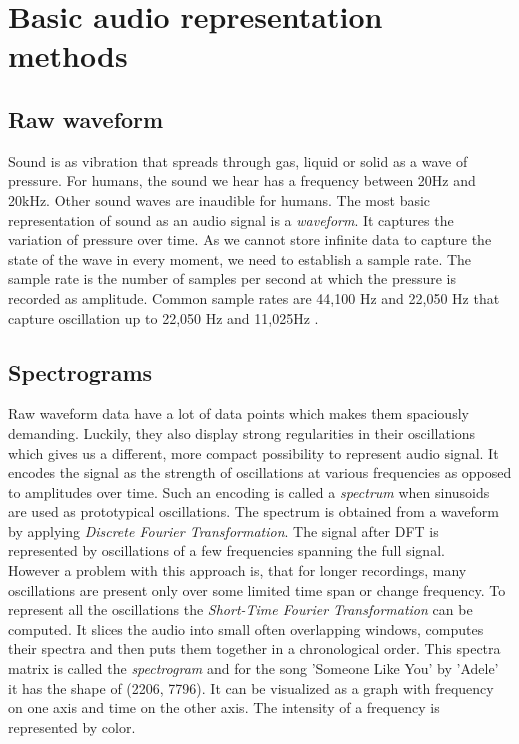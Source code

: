 \section{Basic audio representation methods}\label{sec:basic_music_representation_methods}
 

\subsection{Raw waveform}
Sound is as vibration that spreads through gas, liquid or solid as a wave of pressure. For humans, the sound we hear has a frequency between 20Hz and 20kHz. Other sound waves are inaudible for humans. The most basic representation of sound as an audio signal is a \textit{waveform}. It captures the variation of pressure over time. As we cannot store infinite data to capture the state of the wave in every moment, we need to establish a sample rate. The sample rate is the number of samples per second at which the pressure is recorded as amplitude. Common sample rates are 44,100 Hz and 22,050 Hz that capture oscillation up to 22,050 Hz and 11,025Hz \cite{Schluter2017}.

\subsection{Spectrograms}
Raw waveform data have a lot of data points which makes them spaciously demanding. Luckily, they also display strong regularities in their oscillations which gives us a different, more compact possibility to represent audio signal. It encodes the signal as the strength of oscillations at various frequencies as opposed to amplitudes over time. Such an encoding is called a \textit{spectrum} when sinusoids are used as prototypical oscillations.
The spectrum is obtained from a waveform by applying \textit{Discrete Fourier Transformation}. The signal after DFT is represented by oscillations of a few frequencies spanning the full signal. \\
However a problem with this approach is, that for longer recordings, many oscillations are present only over some limited time span or change frequency. To represent all the oscillations the \textit{Short-Time Fourier Transformation} can be computed. It slices the audio into small often overlapping windows, computes their spectra and then puts them together in a chronological order. This spectra matrix is called the \textit{spectrogram} and for the song 'Someone Like You' by 'Adele' it has the shape of (2206, 7796). It can be visualized as a graph with frequency on one axis and time on the other axis. The intensity of a frequency is represented by color.

